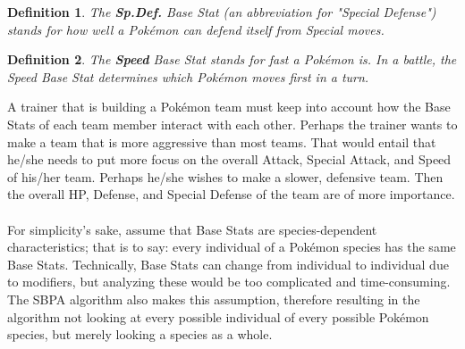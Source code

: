 \documentclass{article}
\newtheorem{definition}{Definition}
\begin{document}
\begin{definition}
	The \textbf{Sp.Def.} Base Stat (an abbreviation for "Special Defense") stands for how well a Pok\'emon can defend itself from Special moves. 
\end{definition}
\begin{definition}
	The \textbf{Speed} Base Stat stands for fast a Pok\'emon is. In a battle, the Speed Base Stat determines which Pok\'emon moves first in a turn.
\end{definition}
A trainer that is building a Pok\'emon team must keep into account how the Base Stats of each team member interact with each other. Perhaps the trainer wants to make a team that is more aggressive than most teams. That would entail that he/she needs to put more focus on the overall Attack, Special Attack, and Speed of his/her team. Perhaps he/she wishes to make a slower, defensive team. Then the overall HP, Defense, and Special Defense of the team are of more importance.\\\\
For simplicity's sake, assume that Base Stats are species-dependent characteristics; that is to say: every individual of a Pok\'emon species has the same Base Stats. Technically, Base Stats can change from individual to individual due to modifiers, but analyzing these would be too complicated and time-consuming. The SBPA algorithm also makes this assumption, therefore resulting in the algorithm not looking at every possible individual of every possible Pok\'emon species, but merely looking a species as a whole.
\end{document}
